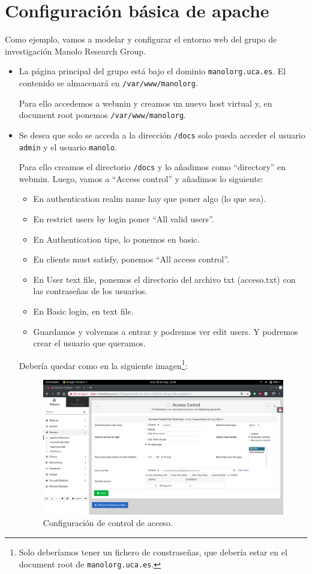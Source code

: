 \documentclass[12pt,letterpaper]{article}
\begin{document}
\newpage
\section{Configuración básica de apache}
Como ejemplo, vamos a modelar y configurar el entorno web del grupo de investigación Manolo Research Group.
\begin{itemize}
	\item La página principal del grupo está bajo el dominio \texttt{manolorg.uca.es}. El contenido se almacenará en \texttt{/var/www/manolorg}.
	
	Para ello accedemos a webmin y creamos un nuevo host virtual y, en document root ponemos \texttt{/var/www/manolorg}.
	
	\item Se desea que solo se acceda a la dirección \texttt{/docs} solo pueda acceder el usuario \texttt{admin} y el usuario \texttt{manolo}.
	
	Para ello creamos el directorio \texttt{/docs} y lo añadimos como ``directory'' en webmin. Luego, vamos a ``Access control'' y añadimos lo siguiente:
	\begin{itemize}
		\item En authentication realm name hay que poner algo (lo que sea).
		\item En restrict users by login poner ``All valid users''.
		\item En Authentication tipe, lo ponemos en basic.
		\item En clients must satisfy, ponemos ``All access control''.
		\item En User text file, ponemos el directorio del archivo txt (acceso.txt) con las contraseñas de los usuarios.
		\item En Basic login, en text file.	
		\item Guardamos y volvemos a entrar y podremos ver edit users. Y podremos crear el usuario que queramos.
	\end{itemize}
	
	\newpage
	Debería quedar como en la siguiente imagen\footnote{Solo deberíamos tener un fichero de constraseñas, que debería estar en el document root de \texttt{manolorg.uca.es}.}:
	\begin{figure}[h]
		\centering
		\includegraphics[scale=0.34]{ControlAcceso.png}
		\caption{Configuración de control de acceso.}
		\label{Configuración de control de acceso}
	\end{figure}


\end{itemize}
\end{document}
